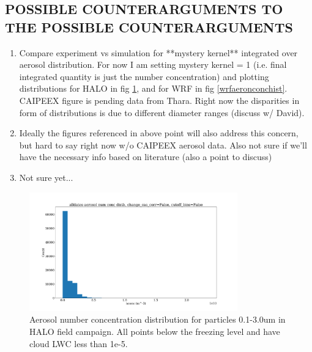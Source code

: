 \documentclass{article}
\begin{document}
\subsection{POSSIBLE COUNTERARGUMENTS TO THE POSSIBLE COUNTERARGUMENTS}
\begin{enumerate}
	\item Compare experiment vs simulation for **mystery kernel** integrated over aerosol distribution. For now I am setting mystery kernel = 1 (i.e. final integrated quantity is just the number concentration) and plotting distributions for HALO in fig \ref{haloaerohist}, and for WRF in fig \ref{wrfaeronconchist}. CAIPEEX figure is pending data from Thara. Right now the disparities in form of distributions is due to different diameter ranges (discuss w/ David).
	\item Ideally the figures referenced in above point will also address this concern, but hard to say right now w/o CAIPEEX aerosol data. Also not sure if we'll have the necessary info based on literature (also a point to discuss) 
	\item Not sure yet...
\end{enumerate}
\begin{figure}[ht]
    \centering
    \includegraphics[width=9cm]{revhalo/v1_aero_nconc_hist_cas_alldates_figure.png}
    \caption{Aerosol number concentration distribution for particles 0.1-3.0um in HALO field campaign. All points below the freezing level and have cloud LWC less than 1e-5.}
    \label{haloaerohist}
\end{figure}
\end{document}
